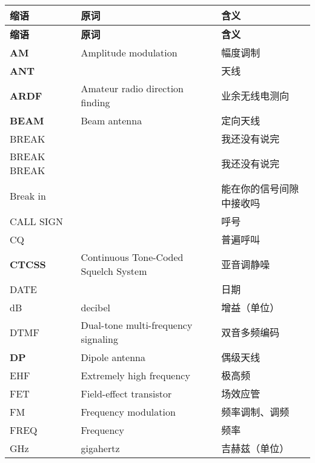 \begin{longtable}[l]{lll}
	\textbf{缩语}    & \textbf{原词}                          & \textbf{含义}         \\
	\endfirsthead
	\textbf{缩语}    & \textbf{原词}                          & \textbf{含义}         \\
	\endhead
	\textbf{AM}    & Amplitude modulation                 & 幅度调制                \\
	\textbf{ANT}   &                                      & 天线                  \\
	\textbf{ARDF}  & Amateur radio direction finding      & 业余无线电测向             \\
	\textbf{BEAM}  & Beam antenna                         & 定向天线                \\
	BREAK          &                                      & 我还没有说完              \\
	BREAK BREAK    &                                      & 我还没有说完              \\
	Break in       &                                      & 能在你的信号间隙中接收吗        \\
	CALL SIGN      &                                      & 呼号                  \\
	CQ             &                                      & 普遍呼叫                \\
	\textbf{CTCSS} & Continuous Tone-Coded Squelch System & 亚音调静噪               \\
	DATE           &                                      & 日期                  \\
	dB             & decibel                              & 增益（单位）              \\
	DTMF           & Dual-tone multi-frequency signaling  & 双音多频编码              \\
	\textbf{DP}    & Dipole antenna                       & 偶级天线                \\
	EHF            & Extremely high frequency             & 极高频                 \\
	FET            & Field-effect transistor              & 场效应管                \\
	FM             & Frequency modulation                 & 频率调制、调频             \\
	FREQ           & Frequency                            & 频率                  \\
	\unit{\GHz}    & gigahertz                            & 吉赫兹（单位）             \\

\end{longtable}
